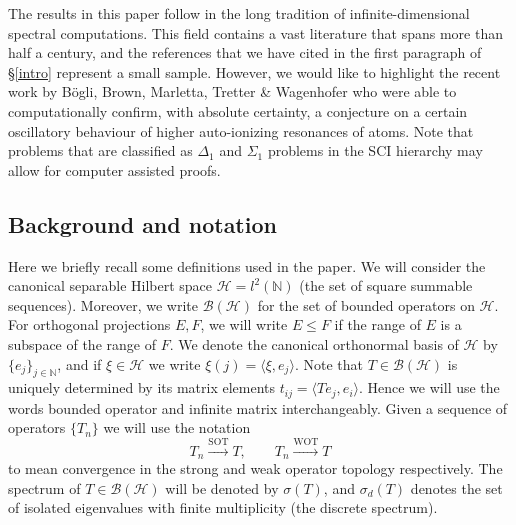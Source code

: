 \documentclass[a4paper,10pt]{article}
\begin{document}
\begin{labeling}{}
\item[\,\,\,{\it Infinite-dimensional spectral computation}:] The results in this paper follow in the long tradition of infinite-dimensional spectral computations. This field contains a vast literature that spans more than half a century, and the references that we have cited in the first paragraph of \S \ref{intro} represent a small sample. However, we would like to highlight the recent work by B{\"o}gli, Brown, Marletta, Tretter \& Wagenhofer \cite{Sabine} who were able to computationally confirm, with absolute certainty, a conjecture on a certain oscillatory behaviour of higher auto-ionizing resonances of atoms. Note that problems that are classified as $\Delta_1$ and $\Sigma_1$ problems in the SCI hierarchy may allow for computer assisted proofs.  
\end{labeling}









\subsection{Background and notation}
\label{background}

Here we briefly recall some definitions used in the paper. We will consider the canonical separable Hilbert space $\mathcal{H} = l^2(\mathbb{N})$ (the set of square summable sequences). Moreover, we write $\mathcal{B}(\mathcal{H})$ for the set of bounded operators on $\mathcal{H}.$ For orthogonal projections $E,F$, we will write $E\leq F$ if the range of $E$ is a subspace of the range of $F$. We denote the canonical orthonormal basis of $\mathcal{H}$ by $\{ e_j \}_{j \in \mathbb{N}}$, and if $\xi \in \mathcal{H}$ we write $\xi(j) = \langle \xi, e_j \rangle.$ Note that $T \in \mathcal{B}(\mathcal{H})$ is uniquely determined by its matrix elements $t_{ij} = \langle Te_j, e_i\rangle$. Hence we will use the words bounded operator and infinite matrix interchangeably. Given a sequence of operators $\{T_n\}$ we will use the notation 
$$
T_n \stackrel{\text{SOT}}{\longrightarrow} T, \qquad T_n \stackrel{\text{WOT}}{\longrightarrow} T
$$
to mean convergence in the strong and weak operator topology respectively. 
The spectrum of $T \in \mathcal{B}(\mathcal{H})$ will be denoted by $\sigma(T)$, and $\sigma_d(T)$ denotes the set of isolated eigenvalues with finite multiplicity (the discrete spectrum). 
\end{document}

